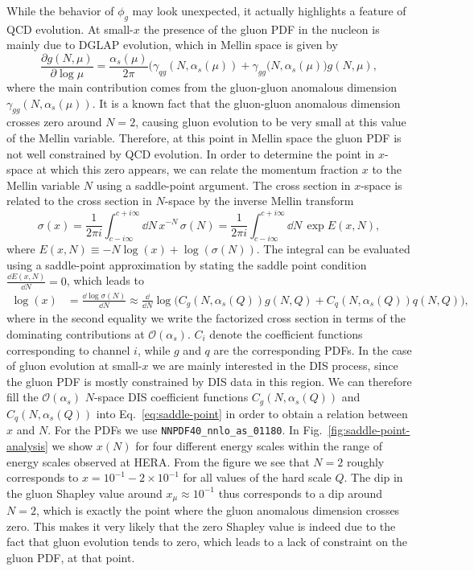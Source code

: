 \documentclass[11pt,a4paper]{article}
\newcommand{\Eva}[1]{{\color{magenta}{EG: #1}}}
\begin{document}
While the behavior of $\phi_g$ may look unexpected, it actually highlights a feature of QCD evolution. At small-$x$ the presence of the gluon PDF in the nucleon is mainly due to DGLAP evolution, which in Mellin space is given by
%
\begin{equation}
    \frac{\partial g(N,\mu)}{\partial\log \mu} = \frac{\alpha_s(\mu)}{2\pi}\big(\gamma_{qg}(N,\alpha_s(\mu)) + \gamma_{gg}(N,\alpha_s(\mu)\big)g(N,\mu),
\end{equation}
%
where the main contribution comes from the gluon-gluon anomalous dimension $\gamma_{gg}(N,\alpha_s(\mu))$. It is a known fact that the gluon-gluon anomalous dimension crosses zero around $N=2$, causing gluon evolution to be very small at this value of the Mellin variable. Therefore, at this point in Mellin space the gluon PDF is not well constrained by QCD evolution. In order to determine the point in $x$-space at which this zero appears, we can relate the momentum fraction $x$ to the Mellin variable $N$ using a saddle-point argument. The cross section in $x$-space is related to the cross section in $N$-space by the inverse Mellin transform
%
\begin{equation}
    \sigma(x) = \frac{1}{2\pi i}\int_{c-i\infty}^{c+i\infty} \dd N\, x^{-N}\,\sigma(N) = \frac{1}{2\pi i}\int_{c-i\infty}^{c+i\infty} \dd N \,\exp{E(x,N)},
\end{equation}
%
where $E(x,N)\equiv -N\log(x) + \log(\sigma(N))$. The integral can be evaluated using a saddle-point approximation by stating the saddle point condition $\frac{\dd E(x,N)}{\dd N}=0$, which leads to
%
\begin{equation}\label{eq:saddle-point}
\begin{aligned}
    \log(x)&=\frac{\dd\log\sigma(N)}{\dd N}\approx \frac{\dd}{\dd N}\log\big( C_g(N,\alpha_s(Q))g(N,Q)+C_q(N,\alpha_s(Q))q(N,Q) \big),
\end{aligned}
\end{equation}
% 
where in the second equality we write the factorized cross section in terms of the dominating contributions at $\mathcal{O}(\alpha_s)$. $C_i$ denote the coefficient functions corresponding to channel $i$, while $g$ and $q$ are the corresponding PDFs. In the case of gluon evolution at small-$x$ we are mainly interested in the DIS process, since the gluon PDF is mostly constrained by DIS data in this region. We can therefore fill the $\mathcal{O}(\alpha_s)$ $N$-space DIS coefficient functions $C_g(N,\alpha_s(Q))$ and $C_q(N,\alpha_s(Q))$ \Eva{(add in appendix)} into Eq.~\eqref{eq:saddle-point} in order to obtain a relation between $x$ and $N$. For the PDFs we use \texttt{NNPDF40\_nnlo\_as\_01180}. In Fig.~\ref{fig:saddle-point-analysis} we show $x(N)$ for four different energy scales within the range of energy scales observed at HERA. From the figure we see that $N=2$ roughly corresponds to $x=10^{-1}-2 \times 10^{-1}$ for all values of the hard scale $Q$. The dip in the gluon Shapley value around $x_\mu\approx 10^{-1}$ thus corresponds to a dip around $N=2$, which is exactly the point where the gluon anomalous dimension crosses zero. This makes it very likely that the zero Shapley value is indeed due to the fact that gluon evolution tends to zero, which leads to a lack of constraint on the gluon PDF, at that point.
\end{document}
